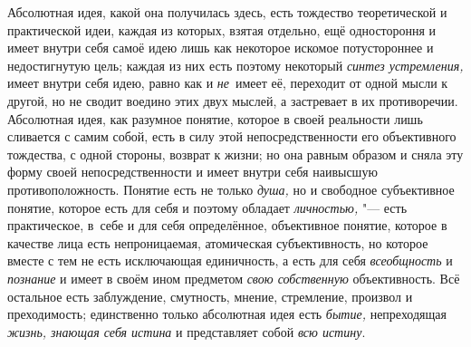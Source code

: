 Абсолютная идея, какой она получилась здесь, есть тождество
теоретической и практической идеи, каждая из которых, взятая отдельно, ещё
одностороння и имеет внутри себя самоё идею лишь как некоторое искомое
потустороннее и недостигнутую цель; каждая из них есть поэтому некоторый
{\em синтез устремления,}
имеет внутри себя идею, равно как и
{\em не}~имеет её,
переходит от одной мысли к другой, но не сводит воедино этих двух мыслей, а
застревает в их противоречии. Абсолютная идея, как разумное понятие,
которое в своей реальности лишь сливается с самим собой, есть в силу этой
непосредственности его объективного тождества, с одной стороны, возврат к
жизни; но она равным образом и сняла эту форму своей непосредственности и
имеет внутри себя наивысшую противоположность. Понятие есть не только
{\em душа,} но и
свободное субъективное понятие, которое есть для себя и поэтому обладает
{\em личностью,} "--- есть
практическое, в~себе и для себя определённое, объективное понятие, которое
в качестве лица есть непроницаемая, атомическая субъективность, но которое
вместе с тем не есть исключающая единичность, а есть для себя
{\em всеобщность} и
{\em познание} и имеет в
своём ином предметом {\em свою
собственную} объективность. Всё остальное есть заблуждение,
смутность, мнение, стремление, произвол и преходимость; единственно только
абсолютная идея есть {\em бытие,}
непреходящая {\em жизнь,
знающая себя истина} и представляет собой
{\em всю истину}.


